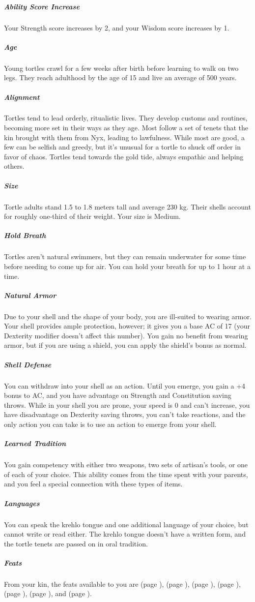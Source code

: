     \subparagraph{Ability Score Increase} Your Strength score increases by 2, and your Wisdom score increases by 1.

    \subparagraph{Age} Young tortles crawl for a few weeks after birth before learning to walk on two legs.
    They reach adulthood by the age of 15 and live an average of 500 years.

    \subparagraph{Alignment} Tortles tend to lead orderly, ritualistic lives.
    They develop customs and routines, becoming more set in their ways as they age.
    Most follow a set of tenets that the kin brought with them from Nyx, leading to lawfulness.
    While most are good, a few can be selfish and greedy, but it's unusual for a tortle to shuck off order in favor of chaos.
    Tortles tend towards the gold tide, always empathic and helping others.

    \subparagraph{Size} Tortle adults stand 1.5 to 1.8 meters tall and average 230 kg.
    Their shells account for roughly one-third of their weight.
    Your size is Medium.

    \subparagraph{Hold Breath} Tortles aren't natural swimmers, but they can remain underwater for some time before needing to come up for air.
    You can hold your breath for up to 1 hour at a time.

    \subparagraph{Natural Armor} Due to your shell and the shape of your body, you are ill-suited to wearing armor.
    Your shell provides ample protection, however; it gives you a base AC of 17 (your Dexterity modifier doesn't affect this number).
    You gain no benefit from wearing armor, but if you are using a shield, you can apply the shield's bonus as normal.

    \subparagraph{Shell Defense} You can withdraw into your shell as an action.
    Until you emerge, you gain a +4 bonus to AC, and you have advantage on Strength and Constitution saving throws.
    While in your shell you are prone, your speed is 0 and can't increase, you have disadvantage on Dexterity saving throws, you can't take reactions, and the only action you can take is to use an action to emerge from your shell.


    \subparagraph{Learned Tradition} You gain competency with either two weapons, two sets of artisan's tools, or one of each of your choice.
    This ability comes from the time spent with your parents, and you feel a special connection with these types of items.

    \subparagraph{Languages} You can speak the krehlo tongue and one additional language of your choice, but cannot write or read either.
    The krehlo tongue doesn't have a written form, and the tortle tenets are passed on in oral tradition.

    \subparagraph{Feats} From your kin, the feats available to you are
    \textbf{} (page \pageref{feat::}),
    \textbf{} (page \pageref{feat::}),
    \textbf{} (page \pageref{feat::}),
    \textbf{} (page \pageref{feat::}),
    \textbf{} (page \pageref{feat::}),
    \textbf{} (page \pageref{feat::}), and
    \textbf{} (page \pageref{feat::}).

\newpage
